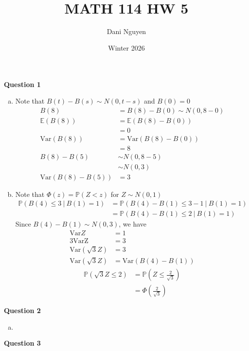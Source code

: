 \documentclass[12pt, letterpaper]{article}
\title{MATH 114 HW 5}
\author{Dani Nguyen}
\date{Winter 2026}
\begin{document}
\maketitle
\graphicspath{ {./} }

\noindent \textbf{Question 1} 
\begin{enumerate}[a.]
    \item Note that $B(t)-B(s)\sim N(0,t-s)$ and $B(0) = 0$
    \begin{align*}
        B(8) &= B(8) - B(0) \sim N(0,8-0)\\
        \mathbb{E}(B(8)) &= \mathbb{E}(B(8)-B(0)) \\
        &= 0 \\
        \text{Var}(B(8)) &= \text{Var}(B(8)-B(0)) \\
        &= 8 \\
        B(8) - B(5) &\sim N(0,8-5) \\
        &\sim N(0,3)\\
        \text{Var}(B(8) - B(5)) &= 3
    \end{align*}
    \item Note that $\Phi(z) = \mathbb{P}(Z<z)$ for $Z \sim N(0,1)$
    \begin{align*}
        \mathbb{P}(B(4)\le 3\ |\ B(1)=1) &= \mathbb{P}(B(4) - B(1)\le 3 - 1\ |\ B(1)=1) \\
        &= \mathbb{P}(B(4) - B(1)\le 2\ |\ B(1)=1)
    \end{align*}
    Since $B(4) - B(1) \sim N(0,3)$, we have
    \begin{align*}
        \text{Var}Z &= 1 \\
        3\text{VarZ} &= 3 \\
        \text{Var}(\sqrt3Z) &= 3 \\
        \text{Var}(\sqrt3Z) &= \text{Var}(B(4)-B(1))
    \end{align*}
    \begin{align*}
        \mathbb{P}(\sqrt3Z\le 2) &= \mathbb{P}(Z \le \frac{2}{\sqrt3}) \\
        &= \Phi\left(\frac{2}{\sqrt3}\right)
    \end{align*}
\end{enumerate}
\noindent \textbf{Question 2} 
\begin{enumerate}[a.]
    \item 
\end{enumerate}
\newpage
\noindent \textbf{Question 3} 
\end{document}
